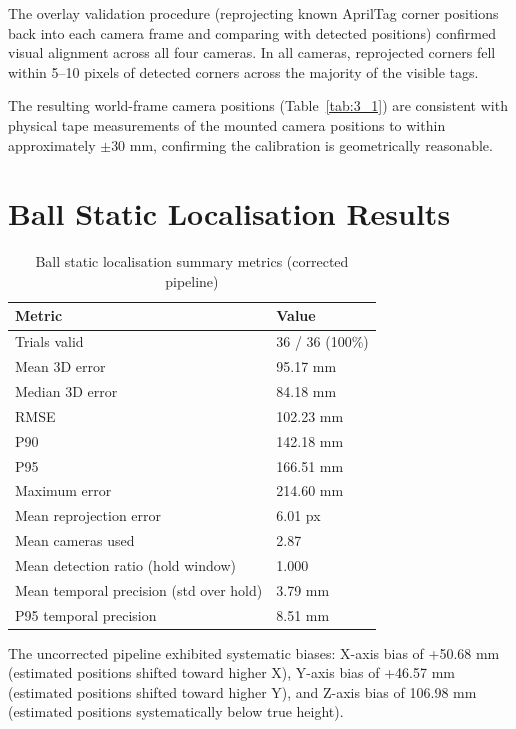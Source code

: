 The overlay validation procedure (reprojecting known AprilTag corner positions back into each camera frame and comparing with detected positions) confirmed visual alignment across all four cameras. In all cameras, reprojected corners fell within 5--10 pixels of detected corners across the majority of the visible tags.

The resulting world-frame camera positions (Table~\ref{tab:3_1}) are consistent with physical tape measurements of the mounted camera positions to within approximately \(\pm\)30 mm, confirming the calibration is geometrically reasonable.

\section{Ball Static Localisation Results}

\begin{table}[htbp]
\centering
\caption{Ball static localisation summary metrics (corrected pipeline)}
\label{tab:5_1}
\begin{tabular}{|l|l|}
\hline
\textbf{Metric} & \textbf{Value} \\
\hline
Trials valid & 36 / 36 (100\%) \\
\hline
Mean 3D error & 95.17 mm \\
\hline
Median 3D error & 84.18 mm \\
\hline
RMSE & 102.23 mm \\
\hline
P90 & 142.18 mm \\
\hline
P95 & 166.51 mm \\
\hline
Maximum error & 214.60 mm \\
\hline
Mean reprojection error & 6.01 px \\
\hline
Mean cameras used & 2.87 \\
\hline
Mean detection ratio (hold window) & 1.000 \\
\hline
Mean temporal precision (std over hold) & 3.79 mm \\
\hline
P95 temporal precision & 8.51 mm \\
\hline
\end{tabular}
\end{table}

The uncorrected pipeline exhibited systematic biases: X-axis bias of +50.68 mm (estimated positions shifted toward higher X), Y-axis bias of +46.57 mm (estimated positions shifted toward higher Y), and Z-axis bias of \textminus{}106.98 mm (estimated positions systematically below true height).

